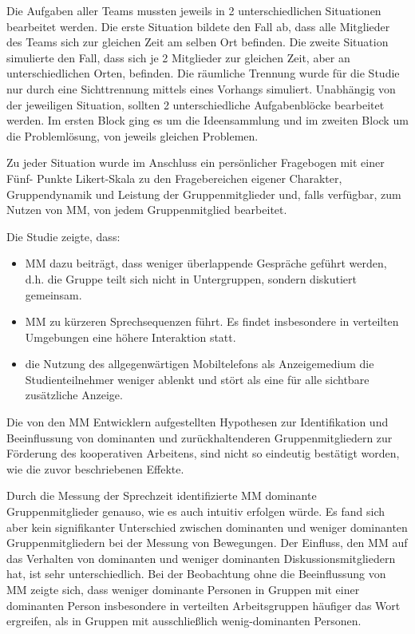 Die Aufgaben aller Teams mussten jeweils in 2 unterschiedlichen Situationen
bearbeitet werden.
Die erste Situation bildete den Fall ab, dass alle Mitglieder des Teams sich zur
gleichen Zeit am selben Ort befinden. Die zweite Situation simulierte den Fall,
dass sich je 2 Mitglieder zur gleichen Zeit, aber an unterschiedlichen Orten,
befinden.
Die räumliche Trennung wurde für die Studie nur durch eine Sichttrennung mittels
eines Vorhangs simuliert.
Unabhängig von der jeweiligen Situation, sollten 2 unterschiedliche
Aufgabenblöcke bearbeitet werden. Im ersten Block ging es um die Ideensammlung
und im zweiten Block um die Pro\-blem\-lö\-sung, von jeweils gleichen Problemen.

Zu jeder Situation wurde im Anschluss ein persönlicher Fragebogen mit einer
Fünf- Punkte Likert-Skala \cite{WP_Likert} zu den Fragebereichen eigener
Charakter, Gruppendynamik und Leistung der Gruppenmitglieder und, falls
verfügbar, zum Nutzen von MM, von jedem Gruppenmitglied bearbeitet.
 
Die Studie \cite{KimChaHolPent2008} zeigte, dass:

\begin{itemize}
  \item MM dazu beiträgt, dass weniger überlappende Gespräche geführt werden, d.h. die
Gruppe teilt sich nicht in Untergruppen, sondern diskutiert gemeinsam.
  \item MM zu kürzeren Sprechsequenzen führt. Es findet insbesondere in verteilten
Umgebungen eine höhere Interaktion statt.
  \item die Nutzung des allgegenwärtigen Mobiltelefons als Anzeigemedium die
Studienteilnehmer weniger ablenkt und stört als eine für alle sichtbare
zusätzliche Anzeige.

\end{itemize}

Die von den MM Entwicklern aufgestellten Hypothesen zur Identifikation und
Beeinflussung von dominanten und zurückhaltenderen Gruppenmitgliedern zur
Förderung des kooperativen Arbeitens, sind nicht so eindeutig bestätigt worden,
wie die zuvor beschriebenen Effekte.

Durch die Messung der Sprechzeit identifizierte MM dominante Gruppenmitglieder
genauso, wie es auch intuitiv erfolgen würde. Es fand sich aber kein
signifikanter Unterschied zwischen dominanten und weniger dominanten
Gruppenmitgliedern bei der Messung von Bewegungen.
Der Einfluss, den MM auf das Verhalten von dominanten und weniger dominanten
Diskussionsmitgliedern hat, ist sehr unterschiedlich.
Bei der Beobachtung ohne die Beeinflussung von MM zeigte sich, dass weniger
dominante Personen in Gruppen mit einer dominanten Person insbesondere in
verteilten Arbeitsgruppen häufiger das Wort ergreifen, als in Gruppen mit
ausschließlich wenig-do\-min\-ant\-en Personen.

